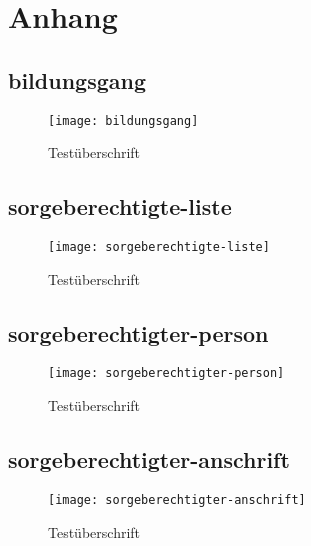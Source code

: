 
\section{Anhang}

\begin{landscape}

\subsection{bildungsgang}
\begin{figure}[H]
    \centering
    \caption{Testüberschrift}
    \begin{adjustbox}{width=\linewidth, center}
        \texttt{[image: bildungsgang]}
    \end{adjustbox}
\end{figure}

\subsection{sorgeberechtigte-liste}
\begin{figure}[H]
    \centering
    \caption{Testüberschrift}
    \begin{adjustbox}{width=\linewidth, center}
        \texttt{[image: sorgeberechtigte-liste]}
    \end{adjustbox}
\end{figure}

\subsection{sorgeberechtigter-person}
\begin{figure}[H]
    \centering
    \caption{Testüberschrift}
    \begin{adjustbox}{width=0.5\linewidth, center}
        \texttt{[image: sorgeberechtigter-person]}
    \end{adjustbox}
\end{figure}

\subsection{sorgeberechtigter-anschrift}
\begin{figure}[H]
    \centering
    \caption{Testüberschrift}
    \begin{adjustbox}{width=0.85\linewidth, center}
        \texttt{[image: sorgeberechtigter-anschrift]}
    \end{adjustbox}
\end{figure}


\end{landscape}
